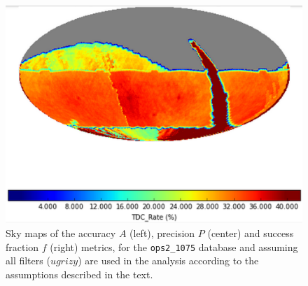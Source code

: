 \begin{figure}[!ht]
\begin{minipage}[b]{\linewidth}
\begin{minipage}[b]{0.32\linewidth}
      \centering\includegraphics[width=\linewidth]{figs/lenstimedelays-ops2_1075-Fraction-skymap.png}
    \end{minipage}
  \end{minipage}
\caption{Sky maps of the accuracy $A$ (left), precision $P$ (center) and
success fraction $f$ (right) metrics, for the \texttt{ops2\_1075} \OpSim
database and assuming all filters ($ugrizy$) are used in the analysis
according to the assumptions described in the text.}
\label{fig:lenstimedelays:results}
\end{figure}


